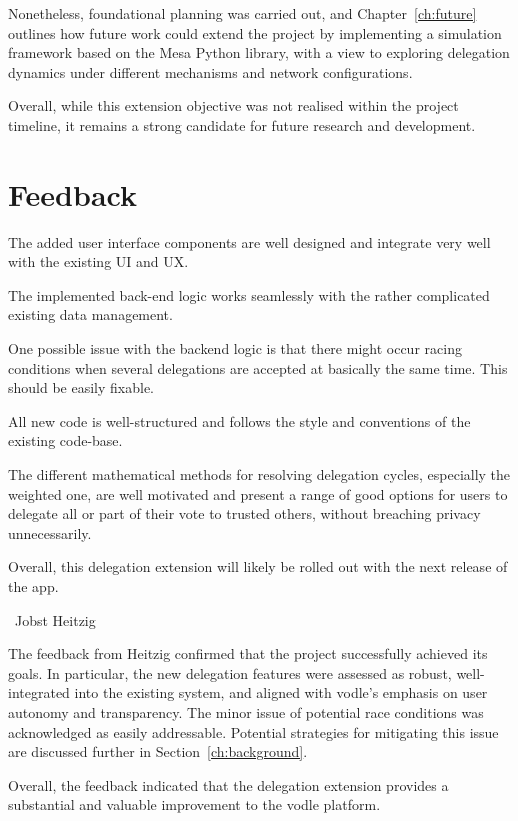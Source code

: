 Nonetheless, foundational planning was carried out, and Chapter~\ref{ch:future} outlines how future work could extend the project by implementing a simulation framework based on the Mesa Python library, with a view to exploring delegation dynamics under different mechanisms and network configurations.

Overall, while this extension objective was not realised within the project timeline, it remains a strong candidate for future research and development.


\section{Feedback}
\label{sec:feedback}

\begin{displayquote}
    The added user interface components are well designed and integrate very well with the existing UI and UX.
    
    The implemented back-end logic works seamlessly with the rather complicated existing data management.
    
    One possible issue with the backend logic is that there might occur racing conditions when several delegations are accepted at basically the same time. This should be easily fixable.
    
    All new code is well-structured and follows the style and conventions of the existing code-base.
    
    The different mathematical methods for resolving delegation cycles, especially the weighted one, are well motivated and present a range of good options for users to delegate all or part of their vote to trusted others, without breaching privacy unnecessarily.
    
    Overall, this delegation extension will likely be rolled out with the next release of the app.
    \end{displayquote}
    
\begin{flushright}
\textemdash\ Jobst Heitzig
\end{flushright}
    

The feedback from Heitzig confirmed that the project successfully achieved its goals. In particular, the new delegation features were assessed as robust, well-integrated into the existing system, and aligned with vodle's emphasis on user autonomy and transparency. The minor issue of potential race conditions was acknowledged as easily addressable. Potential strategies for mitigating this issue are discussed further in Section~\ref{ch:background}.

Overall, the feedback indicated that the delegation extension provides a substantial and valuable improvement to the vodle platform.